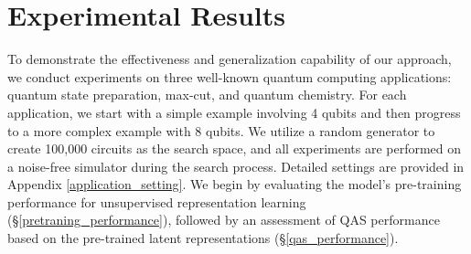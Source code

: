\documentclass{article} %
\begin{document}
\section{Experimental Results}
To demonstrate the effectiveness and generalization capability of our approach, we conduct experiments on three well-known quantum computing applications: quantum state preparation, max-cut, and quantum chemistry. For each application, we start with a simple example involving 4 qubits and then progress to a more complex example with 8 qubits. We utilize a random generator to create 100,000 circuits as the search space, and all experiments are performed on a noise-free simulator during the search process. Detailed settings are provided in Appendix \ref{application_setting}. We begin by evaluating the model's pre-training performance for unsupervised representation learning (§\ref{pretraning_performance}), followed by an assessment of QAS performance based on the pre-trained latent representations (§\ref{qas_performance}).
\end{document}
